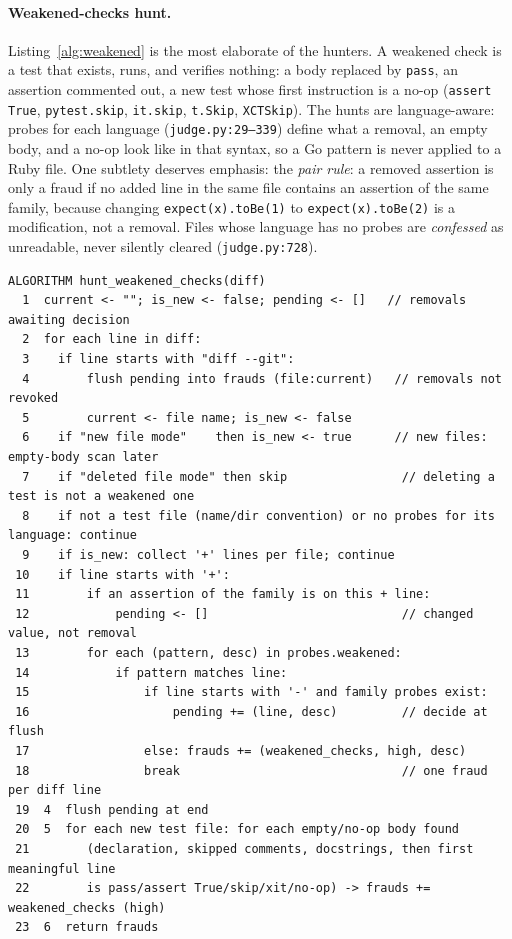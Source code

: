 \documentclass{sbc2019}%
\begin{document}
\paragraph{Weakened-checks hunt.} Listing~\ref{alg:weakened} is the most
elaborate of the hunters. A weakened check is a test that exists,
runs, and verifies nothing: a body replaced by \texttt{pass}, an assertion
commented out, a new test whose first instruction is a no-op
(\texttt{assert True}, \texttt{pytest.skip}, \texttt{it.skip},
\texttt{t.Skip}, \texttt{XCTSkip}). The hunts are language-aware: probes
for each language (\texttt{judge.py:29--339}) define what a removal, an
empty body, and a no-op look like in that syntax, so a Go pattern is never
applied to a Ruby file. One subtlety deserves emphasis: the
\emph{pair rule}: a removed assertion is only a fraud if no added
line in the same file contains an assertion of the same family, because
changing \texttt{expect(x).toBe(1)} to \texttt{expect(x).toBe(2)} is a
modification, not a removal. Files whose language has no probes are
\emph{confessed} as unreadable, never silently cleared
(\texttt{judge.py:728}).

\begin{lstlisting}[caption=weakened-checks hunt (kata/judge.py).,label=alg:weakened]
ALGORITHM hunt_weakened_checks(diff)
  1  current <- ""; is_new <- false; pending <- []   // removals awaiting decision
  2  for each line in diff:
  3    if line starts with "diff --git":
  4        flush pending into frauds (file:current)   // removals not revoked
  5        current <- file name; is_new <- false
  6    if "new file mode"    then is_new <- true      // new files: empty-body scan later
  7    if "deleted file mode" then skip                // deleting a test is not a weakened one
  8    if not a test file (name/dir convention) or no probes for its language: continue
  9    if is_new: collect '+' lines per file; continue
 10    if line starts with '+':
 11        if an assertion of the family is on this + line:
 12            pending <- []                           // changed value, not removal
 13        for each (pattern, desc) in probes.weakened:
 14            if pattern matches line:
 15                if line starts with '-' and family probes exist:
 16                    pending += (line, desc)         // decide at flush
 17                else: frauds += (weakened_checks, high, desc)
 18                break                               // one fraud per diff line
 19  4  flush pending at end
 20  5  for each new test file: for each empty/no-op body found
 21        (declaration, skipped comments, docstrings, then first meaningful line
 22        is pass/assert True/skip/xit/no-op) -> frauds += weakened_checks (high)
 23  6  return frauds
\end{lstlisting}
\end{document}
